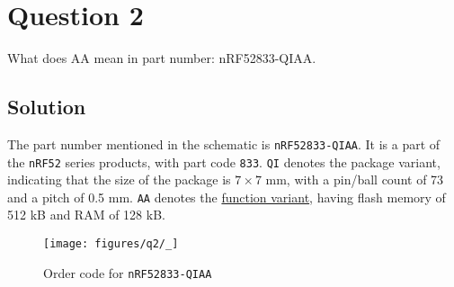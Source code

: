 \section*{Question 2}

What does AA mean in part number: nRF52833-QIAA.\@

\subsection*{Solution}

The part number mentioned in the schematic is \texttt{nRF52833-QIAA}.
It is a part of the \texttt{nRF52} series products, with part code \texttt{833}.
\texttt{QI} denotes the package variant, indicating that the size of the package is \( 7\times 7 \) mm, with a pin/ball count of 73 and a pitch of 0.5 mm.
\texttt{AA} denotes the \underline{function variant}, having flash memory of 512 kB and RAM of 128 kB.\@

\vspace*{0.5em}
\begin{figure}[htb]
    \centering
    \texttt{[image: figures/q2/\_]}
    \vspace*{-2em}
    \caption{Order code for \texttt{nRF52833-QIAA}}
\end{figure}
